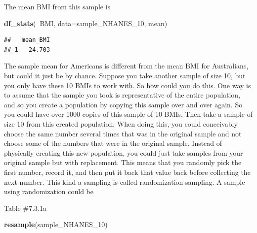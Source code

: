 \documentclass[
]{book}
\newenvironment{Shaded}{\begin{snugshade}}{\end{snugshade}}
\newcommand{\DataTypeTok}[1]{\textcolor[rgb]{0.13,0.29,0.53}{#1}}
\newcommand{\DecValTok}[1]{\textcolor[rgb]{0.00,0.00,0.81}{#1}}
\newcommand{\KeywordTok}[1]{\textcolor[rgb]{0.13,0.29,0.53}{\textbf{#1}}}
\newcommand{\NormalTok}[1]{#1}
\newcommand{\OperatorTok}[1]{\textcolor[rgb]{0.81,0.36,0.00}{\textbf{#1}}}
\begin{document}
The mean BMI from this sample is

\begin{Shaded}
\begin{Highlighting}[]
\KeywordTok{df_stats}\NormalTok{(}\OperatorTok{~}\NormalTok{BMI, }\DataTypeTok{data=}\NormalTok{sample_NHANES_}\DecValTok{10}\NormalTok{, mean)}
\end{Highlighting}
\end{Shaded}

\begin{verbatim}
##   mean_BMI
## 1   24.703
\end{verbatim}

The sample mean for Americans is different from the mean BMI for Australians, but could it just be by chance. Suppose you take another sample of size 10, but you only have these 10 BMIs to work with. So how could you do this. One way is to assume that the sample you took is representative of the entire population, and so you create a population by copying this sample over and over again. So you could have over 1000 copies of this sample of 10 BMIs. Then take a sample of size 10 from this created population. When doing this, you could conceivably choose the same number several times that was in the original sample and not choose some of the numbers that were in the original sample. Instead of physically creating this new population, you could just take samples from your original sample but with replacement. This means that you randomly pick the first number, record it, and then put it back that value back before collecting the next number. This kind a sampling is called randomization sampling. A sample using randomization could be

Table \#7.3.1a

\begin{Shaded}
\begin{Highlighting}[]
\KeywordTok{resample}\NormalTok{(sample_NHANES_}\DecValTok{10}\NormalTok{)}
\end{Highlighting}
\end{Shaded}
\end{document}
